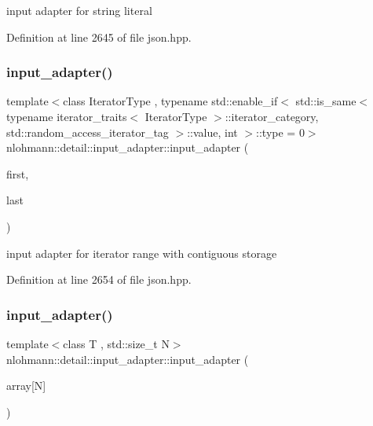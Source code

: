 input adapter for string literal 



Definition at line 2645 of file json.\+hpp.

\mbox{\label{classnlohmann_1_1detail_1_1input__adapter_ad6824b0f792691f75186c527fa31a6b4}} 
\subsubsection{\texorpdfstring{input\_adapter()}{input\_adapter()}\hspace{0.1cm}{\footnotesize\ttfamily [9/11]}}
{\footnotesize\ttfamily template$<$class Iterator\+Type , typename std\+::enable\+\_\+if$<$ std\+::is\+\_\+same$<$ typename iterator\+\_\+traits$<$ Iterator\+Type $>$\+::iterator\+\_\+category, std\+::random\+\_\+access\+\_\+iterator\+\_\+tag $>$\+::value, int $>$\+::type  = 0$>$ \\
nlohmann\+::detail\+::input\+\_\+adapter\+::input\+\_\+adapter (\begin{DoxyParamCaption}\item[{Iterator\+Type}]{first,  }\item[{Iterator\+Type}]{last }\end{DoxyParamCaption})\hspace{0.3cm}{\ttfamily [inline]}}



input adapter for iterator range with contiguous storage 



Definition at line 2654 of file json.\+hpp.

\mbox{\label{classnlohmann_1_1detail_1_1input__adapter_aa2392138bf8307df1994dc7eb22d51ce}} 
\subsubsection{\texorpdfstring{input\_adapter()}{input\_adapter()}\hspace{0.1cm}{\footnotesize\ttfamily [10/11]}}
{\footnotesize\ttfamily template$<$class T , std\+::size\+\_\+t N$>$ \\
nlohmann\+::detail\+::input\+\_\+adapter\+::input\+\_\+adapter (\begin{DoxyParamCaption}\item[{T(\&)}]{array\mbox{[}\+N\mbox{]} }\end{DoxyParamCaption})\hspace{0.3cm}{\ttfamily [inline]}}




